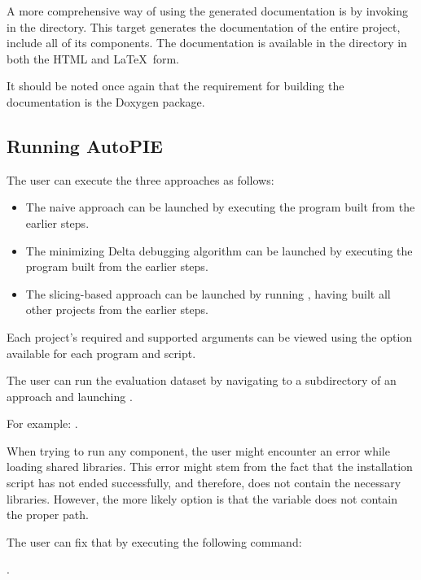 \documentclass[12pt,a4paper]{report}
\let\openright=\clearpage
\begin{document}
A more comprehensive way of using the generated documentation is by invoking
 in the  directory. 
This target generates the documentation of the entire project, include all 
of its components. 
The documentation is available in the  directory in both 
the HTML and \LaTeX~form.

It should be noted once again that the requirement for building 
the documentation is the Doxygen package.

\subsection{Running AutoPIE}

The user can execute the three approaches as follows:

\begin{itemize}
  \item The naive approach can be launched by executing 
  the  program built from the earlier steps.
  \item The minimizing Delta debugging algorithm can be launched by 
  executing the  program built from the earlier steps.
  \item The slicing-based approach can be launched by running 
  , 
  having built all other projects from the earlier steps.
\end{itemize}

Each project's required and supported arguments can be viewed using 
the  option available for each program and script.

The user can run the evaluation dataset by navigating to a subdirectory of 
an approach and launching . 

For example: .

When trying to run any component, the user might encounter an error while 
loading shared libraries. 
This error might stem from the fact that the installation script has not 
ended successfully, and therefore,  does not contain 
the necessary libraries. 
However, the more likely option is that the  variable 
does not contain the proper path. 

The user can fix that by executing the following command:

.

\openright
\end{document}
